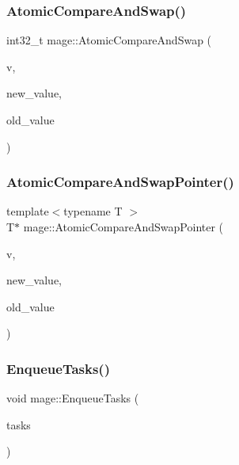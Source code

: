 \subsubsection{\texorpdfstring{Atomic\+Compare\+And\+Swap()}{AtomicCompareAndSwap()}}
{\footnotesize\ttfamily int32\+\_\+t mage\+::\+Atomic\+Compare\+And\+Swap (\begin{DoxyParamCaption}\item[{Atomic\+Int32 $\ast$}]{v,  }\item[{int32\+\_\+t}]{new\+\_\+value,  }\item[{int32\+\_\+t}]{old\+\_\+value }\end{DoxyParamCaption})}

\hypertarget{namespacemage_a1a36a24cbbc8aea1abb809a10bfdf4d1}{}\label{namespacemage_a1a36a24cbbc8aea1abb809a10bfdf4d1} 
\subsubsection{\texorpdfstring{Atomic\+Compare\+And\+Swap\+Pointer()}{AtomicCompareAndSwapPointer()}}
{\footnotesize\ttfamily template$<$typename T $>$ \\
T$\ast$ mage\+::\+Atomic\+Compare\+And\+Swap\+Pointer (\begin{DoxyParamCaption}\item[{T $\ast$$\ast$}]{v,  }\item[{T $\ast$}]{new\+\_\+value,  }\item[{T $\ast$}]{old\+\_\+value }\end{DoxyParamCaption})}

\hypertarget{namespacemage_a0f0fa32534696afa66b313ffebbf9caf}{}\label{namespacemage_a0f0fa32534696afa66b313ffebbf9caf} 
\subsubsection{\texorpdfstring{Enqueue\+Tasks()}{EnqueueTasks()}}
{\footnotesize\ttfamily void mage\+::\+Enqueue\+Tasks (\begin{DoxyParamCaption}\item[{const vector$<$ \hyperlink{classmage_1_1_task}{Task} $\ast$$>$ \&}]{tasks }\end{DoxyParamCaption})}

